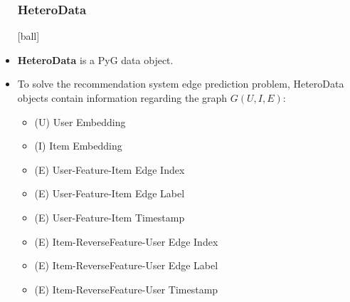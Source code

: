 \documentclass{beamer}
\begin{document}
\begin{frame}[fragile]
\begin{itemize}
\frametitle{HeteroData}
[ball]

\item \textbf{HeteroData} is a PyG data object.

\vspace{0.3cm}



\vspace{0.3cm}

\item To solve the recommendation system edge prediction problem, HeteroData objects contain information regarding the graph $G(U,I,E)$: \\ 
\begin{itemize}
    \item (U) User Embedding 
    \item (I) Item Embedding
    \item (E) User-Feature-Item Edge Index
    \item (E) User-Feature-Item Edge Label
    \item (E) User-Feature-Item Timestamp
    \item (E) Item-ReverseFeature-User Edge Index
    \item (E) Item-ReverseFeature-User Edge Label
    \item (E) Item-ReverseFeature-User Timestamp
\end{itemize}

\end{itemize}
\end{frame}

\end{document}
